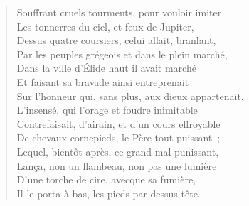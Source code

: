 \documentclass[french,twoside]{book} %
\begin{document}
\begin{verse}
Souffrant cruels tourments, pour vouloir imiter\\
Les tonnerres du ciel, et feux de Jupiter,\\
Dessus quatre coursiers, celui allait, branlant,\\
Par les peuples grégeois et dans le plein marché,\\
Dans la ville d’Élide haut il avait marché\\
Et faisant sa bravade ainsi entreprenait\\
Sur l’honneur qui, sans plus, aux dieux appartenait.\\
L’insensé, qui l’orage et foudre inimitable\\
Contrefaisait, d’airain, et d’un cours effroyable\\
De chevaux cornepieds, le Père tout puissant ;\\
Lequel, bientôt après, ce grand mal punissant,\\
Lança, non un flambeau, non pas une lumière\\
D’une torche de cire, avecque sa fumière,\\
Il le porta à bas, les pieds par-dessus tête.\\
\end{verse}
\end{document}
